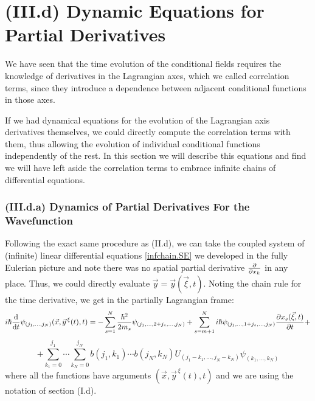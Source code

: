 \documentclass[11pt, a4paper]{article} %
\begin{document}
\section*{(III.d) Dynamic Equations for Partial Derivatives}\vspace{-0.2cm}
We have seen that the time evolution of the conditional fields requires the knowledge of derivatives in the Lagrangian axes, which we called correlation terms, since they introduce a dependence between adjacent conditional functions in those axes.

If we had dynamical equations for the evolution of the Lagrangian axis derivatives themselves, we could directly compute the correlation terms with them, thus allowing the evolution of individual conditional functions independently of the rest. In this section we will describe this equations and find we will have left aside the correlation terms to embrace infinite chains of differential equations.

\subsubsection*{(III.d.a) Dynamics of Partial Derivatives For the Wavefunction}\vspace{-0.1cm}
Following the exact same procedure as (II.d), we can take the coupled system of (infinite) linear differential equations \eqref{infchain.SE} we developed in the fully Eulerian picture and note there was no spatial partial derivative $\pdv{}{x_k}$ in any place. Thus, we could directly evaluate $\vec{y}=\vec{y}(\vec{\xi},t)$. Noting the chain rule for the time derivative, we get in the partially Lagrangian frame:\vspace{-0.1cm}
\begin{equation}\label{infchain.SE.EL}
i\hbar \dv{}{t}\psi_{(j_1,...,j_N)}(\vec{x},\vec{y}^{\, \xi}(t),t)=-\sum_{s=1}^N\frac{\hbar^2}{2m_s}\psi_{(j_1,...,2+j_s,...,j_N)}+\sum_{s=m+1}^N i\hbar \psi_{(j_1,...,1+j_s,...,j_N)} \pdv{x_s(\vec{\xi},t)}{t}+\vspace{-0.1cm}
\end{equation}
$$
+\sum_{k_1=0}^{j_1}\cdots\sum_{k_N=0}^{j_N} b(j_1,k_1)\cdots b(j_N,k_N)U_{(j_1-k_1,...,j_N-k_N)}\psi_{(k_1,...,k_N)}
$$
where all the functions have arguments $(\vec{x},\vec{y}^{\, \xi}(t),t)$ and we are using the notation of section (I.d).
\end{document}

